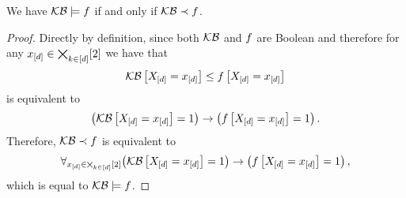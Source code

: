 \begin{theorem} \label{the:orderingEntailmentCriterion}
	We have $\mathcal{KB}\models f$ if and only if $\mathcal{KB}\prec f$.
\end{theorem}
\begin{proof}
	Directly by definition, since both $\mathcal{KB}$ and $f$ are Boolean and therefore for any $x_{[d]}\in\bigtimes_{k\in[d]}[2]$ we have that
		\[ \mathcal{KB}\left[X_{[d]}=x_{[d]}\right] \leq f\left[X_{[d]}=x_{[d]}\right] \]
	is equivalent to 
		\[ \big(\mathcal{KB}\left[X_{[d]}=x_{[d]}\right]=1\big) \rightarrow \big(f\left[X_{[d]}=x_{[d]}\right]=1\big) \, .  \]
	Therefore, $\mathcal{KB}\prec f$ is equivalent to
		\[ \forall_{x_{[d]}\in\bigtimes_{k\in[d]}[2]} \big(\mathcal{KB}\left[X_{[d]}=x_{[d]}\right]=1\big) \rightarrow \big(f\left[X_{[d]}=x_{[d]}\right]=1\big) \, , \]
	which is equal to $\mathcal{KB}\models f$.
\end{proof}










